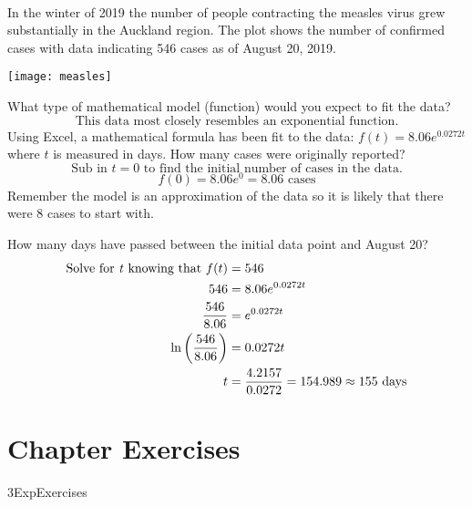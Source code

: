 \examq\medskip \\In the winter of 2019 the number of people contracting the measles virus grew substantially in the Auckland region. The plot shows the number of confirmed cases with data indicating 546 cases as of August 20, 2019.
\begin{center}
	\texttt{[image: measles]}
\end{center}
\begin{tasks}
	\task What type of mathematical model (function) would you expect to fit the data?\\
	\[\text{This data most closely resembles an exponential function.}\]
	\task Using Excel, a mathematical formula has been fit to the data:	$\displaystyle f(t)=8.06e^{0.0272t}$ where $t$ is measured in days. How many cases were originally reported?\\
	\[\text{Sub in $t=0$ to find the initial number of cases in the data.}\]
	\[f(0)=8.06e^0=8.06 \text{ cases}\]
	Remember the model is an approximation of the data so it is likely that there were 8 cases to start with.
	
	\task How many days have passed between the initial data point and August 20?\\
	\begin{align*}\text{Solve for \textit{t} knowing that }f(t)&=546\\
	546&=8.06e^{0.0272t}\\
	\frac{546}{8.06}&=e^{0.0272t}\\
	\ln\left(\frac{546}{8.06}\right)&=0.0272t\\
	t&=\frac{4.2157}{0.0272}=154.989\approx 155\text{ days}\\
	\end{align*}
\end{tasks}

\section{Chapter Exercises}
{3ExpExercises}

